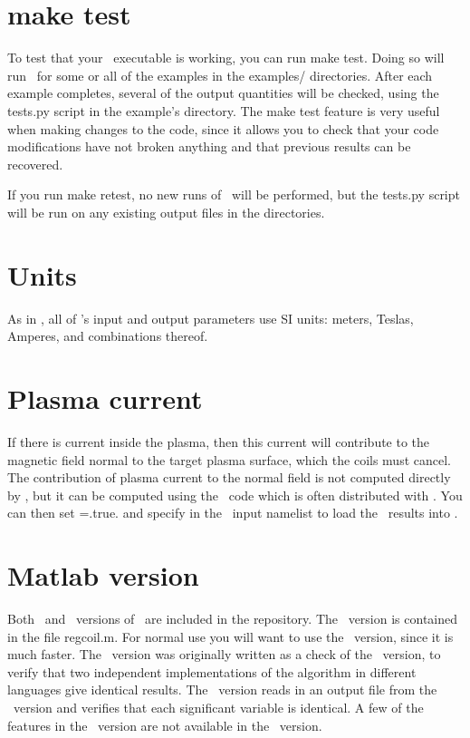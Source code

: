 \section{\ttfamily make test}

To test that your \regcoil~executable is working, you can run {\ttfamily make test}.  Doing so will run
\regcoil~for some or all of the examples in the {\ttfamily examples/} directories.
After each example completes, several of the output quantities
will be checked, using the
{\ttfamily tests.py} script in the example's directory.
The {\ttfamily make test} feature is very useful when making changes to the code, since it allows you to check
that your code modifications have not broken anything and that previous results
can be recovered.

If you run {\ttfamily make retest},
no new runs of \regcoil~will be performed, but the {\ttfamily tests.py} script
will be run on any existing output files in the  directories.

\section{Units}

As in \vmec, all of \regcoil's input and output parameters use SI units: meters, Teslas, Amperes, and combinations thereof.

\section{Plasma current}

If there is current inside the plasma, then this current will contribute to the magnetic field normal
to the target plasma surface, which the coils must cancel. The contribution of plasma current to the normal field
is not computed directly by \regcoil, but it can be computed using the \bnorm~code which is 
often distributed with \vmec.  You can then set ={\ttfamily .true.} and specify 
in the \regcoil~input namelist to load the \bnorm~results into \regcoil.

\section{Matlab version}

Both \fortran~and \matlab~versions of \regcoil~are included in the repository.  The \matlab~version is
contained in the file {\ttfamily regcoil.m}. For normal
use you will want to use the \fortran~version, since it is much faster.  The \matlab~version was originally
written as a check of the \fortran~version, to verify that two independent implementations of the algorithm
in different languages give identical results.  The \matlab~version reads in an output file from the \fortran~version
and verifies that each significant variable is identical.  A few of the features in the \fortran~version
are not available in the \matlab~version.

